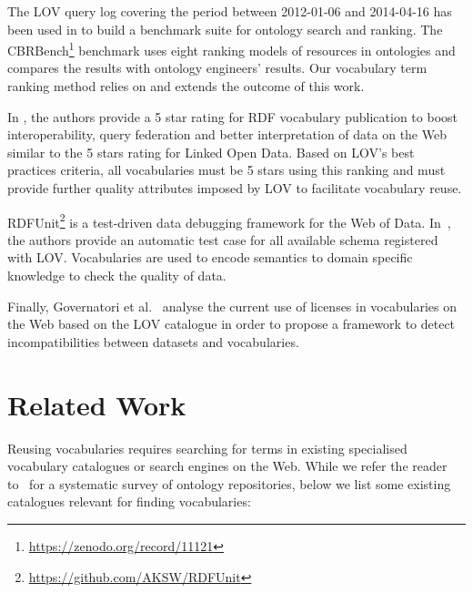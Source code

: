 \documentclass{iosart2c}
\begin{document}
The LOV query log covering the period between 2012-01-06 and 2014-04-16 has been used in \cite{butt2014} to build a benchmark suite for ontology search and ranking. The CBRBench\footnote{\url{https://zenodo.org/record/11121}} benchmark uses eight ranking models of resources in ontologies and compares the results  with ontology engineers' results. Our vocabulary term ranking method relies on and extends the outcome of this work.


In \cite{janowicz2014five}, the authors provide a 5 star rating for RDF vocabulary publication to boost interoperability, query federation and better interpretation of data on the Web similar to the 5 stars rating for Linked Open Data. Based on LOV's  best practices criteria, all vocabularies must be 5 stars using this ranking and must provide further quality attributes imposed by LOV to facilitate vocabulary reuse.


RDFUnit\footnote{\url{https://github.com/AKSW/RDFUnit}} is a test-driven data debugging framework for the Web of Data. In~\cite{rdfunit}, the authors provide an automatic test case for all available schema registered with LOV. Vocabularies are used to encode semantics to domain specific knowledge to check the quality of data.

Finally, Governatori et al.~\cite{governatori2014} analyse the current use of licenses in vocabularies on the Web based on the LOV catalogue in order to propose a framework to detect incompatibilities between datasets and vocabularies.



\section{Related Work}
\label{sec:related}
Reusing vocabularies requires searching for terms in existing specialised vocabulary catalogues or search engines on the Web. While we refer the reader to~\cite{AquinJoWS12} for a systematic survey of ontology repositories, below we list some existing catalogues relevant for finding vocabularies:  
\end{document}
